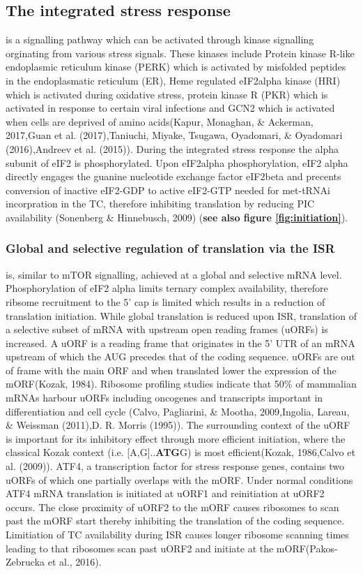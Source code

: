\documentclass[12pt,openany]{book}
\begin{document}
\clearpage
\subsection{The integrated stress response} is a signalling pathway
which can be activated through kinase signalling orginating from various
stress signals. These kinases include Protein kinase R-like endoplasmic
reticulum kinase (PERK) which is activated by misfolded peptides in the
endoplasmatic reticulum (ER), Heme regulated eIF2alpha kinase (HRI)
which is activated during oxidative stress, protein kinase R (PKR) which
is activated in response to certain viral infections and GCN2 which is
activated when cells are deprived of amino acids(Kapur, Monaghan, \&
Ackerman, 2017,Guan et al. (2017),Taniuchi, Miyake, Tsugawa, Oyadomari,
\& Oyadomari (2016),Andreev et al. (2015)). During the integrated stress
response the alpha subunit of eIF2 is phosphorylated. Upon eIF2alpha
phosphorylation, eIF2 alpha directly engages the guanine nucleotide
exchange factor eIF2beta and precents conversion of inactive eIF2-GDP to
active eIF2-GTP needed for met-tRNAi incorpration in the TC, therefore
inhibiting translation by reducing PIC availability (Sonenberg \&
Hinnebusch, 2009) (\textbf{see also figure \ref{fig:initiation}}).

\subsubsection{Global and selective regulation of translation via the ISR}

is, similar to mTOR signalling, achieved at a global and selective mRNA
level. Phosphorylation of eIF2 alpha limits ternary complex
availability, therefore ribsome recruitment to the 5' cap is limited
which results in a reduction of translation initiation. While global
translation is reduced upon ISR, translation of a selective subset of
mRNA with upstream open reading frames (uORFs) is increased. A uORF is a
reading frame that originates in the 5' UTR of an mRNA upstream of which
the AUG precedes that of the coding sequence. uORFs are out of frame
with the main ORF and when translated lower the expression of the
mORF(Kozak, 1984). Ribosome profiling studies indicate that 50\% of
mammalian mRNAs harbour uORFs including oncogenes and transcripts
important in differentiation and cell cycle (Calvo, Pagliarini, \&
Mootha, 2009,Ingolia, Lareau, \& Weissman (2011),D. R. Morris (1995)).
The surrounding context of the uORF is important for its inhibitory
effect through more efficient initiation, where the classical Kozak
context (i.e. {[}A,G{]}..\textbf{ATG}G) is most efficient(Kozak,
1986,Calvo et al. (2009)). ATF4, a transcription factor for stress
response genes, contains two uORFs of which one partially overlaps with
the mORF. Under normal conditions ATF4 mRNA translation is initiated at
uORF1 and reinitiation at uORF2 occurs. The close proximity of uORF2 to
the mORF causes ribosomes to scan past the mORF start thereby inhibiting
the translation of the coding sequence. Limitiation of TC availability
during ISR causes longer ribosome scanning times leading to that
ribosomes scan past uORF2 and initiate at the mORF(Pakos-Zebrucka et
al., 2016).
\end{document}
